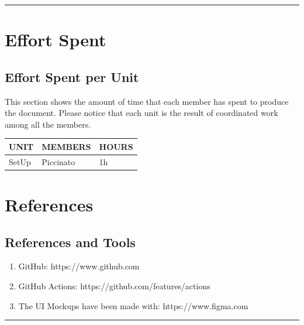 \documentclass{Configuration_Files/Template}
\begin{document}
{\color{bluepoli}\rule{\linewidth}{0.1pt}}

\chapter{Effort Spent}

\section{Effort Spent per Unit}

This section shows the amount of time that each member has spent to produce the document. Please notice that each unit is the result of coordinated work among all the members.

\begin{table}[h]
\centering
\begin{tabularx}{\textwidth}{| X | X | X |}
\hline
\textbf{UNIT} & \textbf{MEMBERS} & \textbf{HOURS} \\ [1ex]
\hline
SetUp & Piccinato & 1h \\ [1ex]
\hline
\end{tabularx}
\end{table}

\chapter{References}

\section{References and Tools}

\begin{enumerate}
    \item GitHub: https://www.github.com
    \item GitHub Actions: https://github.com/features/actions
    \item The UI Mockups have been made with: https://www.figma.com
\end{enumerate}

{\color{bluepoli}\rule{\linewidth}{0.1pt}}
\end{document}
